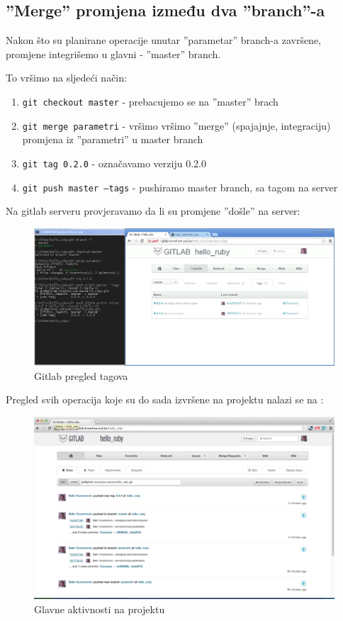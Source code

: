 \documentclass[times, utf8, seminar]{fit}
\begin{document}
\subsection{''Merge'' promjena između dva ''branch''-a}

Nakon što su planirane operacije unutar ''parametar'' branch-a završene, promjene integrišemo u glavni - ''master'' branch.

To vršimo na sljedeći način:
\begin{enumerate}
  \item \texttt{git checkout master} - prebacujemo se na ''master'' brach
  \item \texttt{git merge parametri} - vršimo vršimo ''merge'' (spajajnje, integraciju) promjena iz ''parametri'' u  master branch
  \item \texttt{git tag 0.2.0} - označavamo verziju 0.2.0
  \item \texttt{git push master --tags} - pushiramo master branch, sa tagom na server
\end{enumerate}

Na gitlab serveru provjeravamo da li su promjene ''došle'' na server:

\begin{figure}[H]
\centering
\includegraphics[width=15cm]{img/gitlab_tags.png}
\caption{Gitlab pregled tagova}
\end{figure}

Pregled svih operacija koje su do sada izvršene na projektu nalazi se na \href{https://gitlab.knowhow.out.ba/hello\_ruby}{\color{blue}{URL-u projekta}}:

\begin{figure}[H]
\centering
\includegraphics[width=15cm]{img/gitlab_project_show.png}
\caption{Glavne aktivnosti na projektu}
\end{figure}
\end{document}
